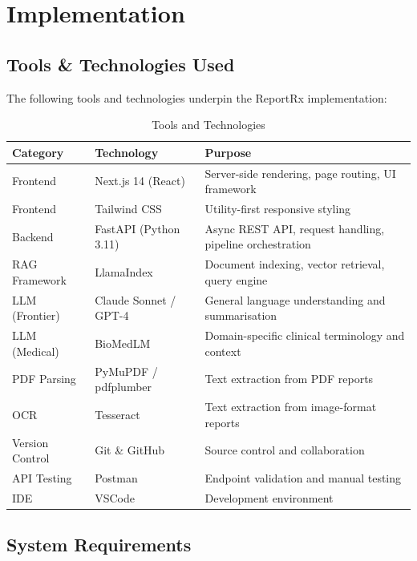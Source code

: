 \chapter{Implementation}

\section{Tools \& Technologies Used}
The following tools and technologies underpin the ReportRx implementation:

\begin{table}[h]
\centering
\caption{Tools and Technologies}
\begin{tabular}{|p{2.5cm}|p{4cm}|p{5cm}|}
    \hline
    \textbf{Category} & \textbf{Technology} & \textbf{Purpose} \\
    \hline
    Frontend & Next.js 14 (React) & Server-side rendering, page routing, UI framework \\
    Frontend & Tailwind CSS & Utility-first responsive styling \\
    Backend & FastAPI (Python 3.11) & Async REST API, request handling, pipeline orchestration \\
    RAG Framework & LlamaIndex & Document indexing, vector retrieval, query engine \\
    LLM (Frontier) & Claude Sonnet / GPT-4 & General language understanding and summarisation \\
    LLM (Medical) & BioMedLM & Domain-specific clinical terminology and context \\
    PDF Parsing & PyMuPDF / pdfplumber & Text extraction from PDF reports \\
    OCR & Tesseract & Text extraction from image-format reports \\
    Version Control & Git \& GitHub & Source control and collaboration \\
    API Testing & Postman & Endpoint validation and manual testing \\
    IDE & VSCode & Development environment \\
    \hline
\end{tabular}
\end{table}

\section{System Requirements}


